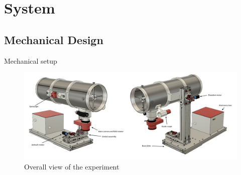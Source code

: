 \documentclass[11pt, aspectratio=169]{beamer}
\begin{document}
\section{System}
\subsection{Mechanical Design}
\begin{frame}{Mechanical setup}
	\begin{figure}
		\centering
		\includegraphics[width=\textwidth]{figures/Mechanical/iso1.png}
		\caption{Overall view of the experiment}	
		\label{img::mech1}
	\end{figure}
\end{frame}
\end{document}
